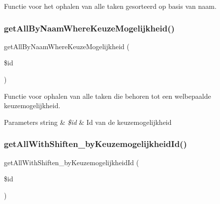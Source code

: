 Functie voor het ophalen van alle taken gesorteerd op basis van naam. 

\mbox{\label{class_taken___model_a6f3e4d26ab480501524eabb01683f5f7}} 
\subsubsection{\texorpdfstring{get\+All\+By\+Naam\+Where\+Keuze\+Mogelijkheid()}{getAllByNaamWhereKeuzeMogelijkheid()}}
{\footnotesize\ttfamily get\+All\+By\+Naam\+Where\+Keuze\+Mogelijkheid (\begin{DoxyParamCaption}\item[{}]{\$id }\end{DoxyParamCaption})}



Functie voor ophalen van alle taken die behoren tot een welbepaalde keuzemogelijkheid. 


\begin{DoxyParams}[1]{Parameters}
string & {\em \$id} & Id van de keuzemogelijkheid \\
\hline
\end{DoxyParams}
\mbox{\label{class_taken___model_a43d1fa46aefbe64343373fac217d6bdb}} 
\subsubsection{\texorpdfstring{get\+All\+With\+Shiften\+\_\+by\+Keuzemogelijkheid\+Id()}{getAllWithShiften\_byKeuzemogelijkheidId()}}
{\footnotesize\ttfamily get\+All\+With\+Shiften\+\_\+by\+Keuzemogelijkheid\+Id (\begin{DoxyParamCaption}\item[{}]{\$id }\end{DoxyParamCaption})}



